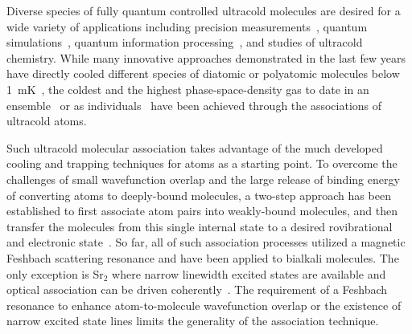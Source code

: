 \documentclass[aps,prl,twocolumn,groupedaddress]{revtex4-1}
\begin{document}

Diverse species of fully quantum controlled  ultracold molecules are desired for a  wide variety of applications including precision measurements~\cite{Nick_and_Ivan2017}, quantum simulations~\cite{Yao2018}, quantum  information processing~\cite{DeMille2002, Ni2018}, and studies of ultracold chemistry.
While many innovative approaches demonstrated in the last few years have directly cooled different species of diatomic or polyatomic molecules  below 1~mK~\cite{Norrgard2016}, the coldest and the highest phase-space-density gas to date in an ensemble~\cite{Demarco2018} or as individuals~\cite{Zhang2020}  have been achieved through the associations of ultracold atoms.

Such ultracold molecular association takes advantage of the much developed cooling and trapping techniques for atoms as a starting point. To overcome the challenges of small wavefunction overlap and the large release of binding energy of converting atoms to deeply-bound molecules, a  two-step approach has been established to first associate atom pairs into weakly-bound molecules, and then transfer the molecules from this single internal state to a desired rovibrational and electronic state~\cite{Danzl2008, Ni2008,Lang2008, Takekoshi2014, Molony2014, Park2015, Guo2016, Kondov2019, Voges2020}.
So far, all of such association processes  utilized a magnetic Feshbach scattering resonance and have been applied to bialkali molecules. The only exception is Sr$_2$ where narrow linewidth excited states are available and optical association can be driven coherently~\cite{Reinaudi2012,Stellmer2012}. The requirement of a Feshbach resonance to enhance atom-to-molecule wavefunction overlap or the existence of narrow excited state lines limits the generality of the association technique. %
\end{document}
